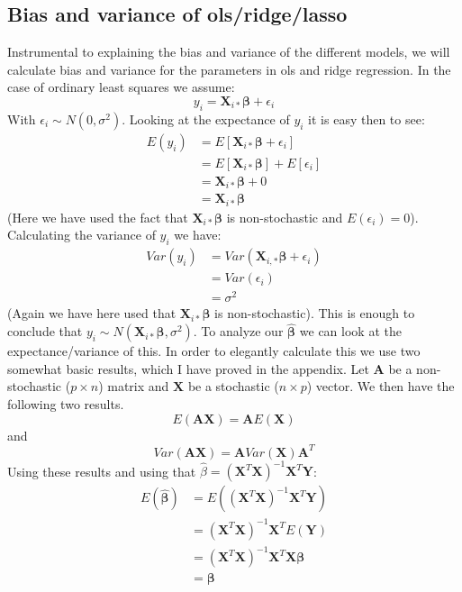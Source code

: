 \documentclass{article}
\begin{document}
\subsection{Bias and variance of ols/ridge/lasso}
Instrumental to explaining the bias and variance of the different models, we
will calculate bias and variance for the parameters in ols and ridge regression.
In the case of ordinary least squares we assume:
$$y_i = \mathbf{X}_{i *} \mathbf{\beta} + \epsilon_i$$
With $\epsilon_i \sim N(0, \sigma^2)$. Looking at the expectance of $y_i$ it is
easy then to see:
\begin{align*}
    E(y_i) & = E\left[ \mathbf{X}_{i *} \mathbf{\beta} + \epsilon_i \right]                 \\
           & = E\left[ \mathbf{X}_{i *} \mathbf{\beta} \right] + E\left[ \epsilon_i \right] \\
           & = \mathbf{X}_{i *} \mathbf{\beta} + 0                                          \\
           & = \mathbf{X}_{i *}\mathbf{\beta}
\end{align*}
(Here we have used the fact that $\mathbf{X}_{i *} \mathbf{\beta}$ is
non-stochastic and $E(\epsilon_i) = 0$). Calculating the variance of $y_i$ we
have:
\begin{align*}
    Var(y_i) & = Var(\mathbf{X}_{i, *} \mathbf{\beta} + \epsilon_i) \\
             & = Var(\epsilon_i)                                    \\
             & = \sigma^2
\end{align*}
(Again we have here used that $\mathbf{X}_{i *} \mathbf{\beta}$ is non-stochastic).
This is enough to conclude that $y_i \sim N(\mathbf{X}_{i *} \mathbf{\beta},
    \sigma^2)$.  To analyze our $\mathbf{\hat{\beta}}$ we can look at the
expectance/variance of this. In order to elegantly calculate this we use two
somewhat basic results, which I have proved in the appendix. Let $\mathbf{A}$ be a
non-stochastic ($p\times n$) matrix and $\mathbf{X}$ be a stochastic ($n \times
    p$) vector. We then have the following two results.
$$E(\mathbf{A} \mathbf{X}) = \mathbf{A} E(\mathbf{X})$$
and
$$Var(\mathbf{A} \mathbf{X}) = \mathbf{A} Var(\mathbf{X}) \mathbf{A}^T$$
Using these results and using that $\hat{\beta} = (\mathbf{X}^T \mathbf{X})^{-1} \mathbf{X}^T \mathbf{Y}$:
\begin{align*}
    E(\mathbf{\hat{\beta}}) & = E((\mathbf{X}^T \mathbf{X})^{-1} \mathbf{X}^T \mathbf{Y})             \\
                            & = (\mathbf{X}^T \mathbf{X})^{-1} \mathbf{X}^T E(\mathbf{Y})             \\
                            & = (\mathbf{X}^T \mathbf{X})^{-1} \mathbf{X}^T \mathbf{X} \mathbf{\beta} \\
                            & = \mathbf{\beta}
\end{align*}
\end{document}

